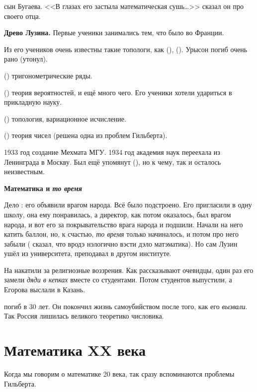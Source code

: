 \documentclass[a4paper,oneside,fleqn,10pt]{article}
\begin{document}
 сын Бугаева.
<<В глазах его застыла математическая сушь\ldots>> сказал он про своего отца.

\textbf{Древо Лузина.}
Первые ученики  занимались тем, что было во Франции.

Из его учеников
очень известны такие топологи, как  (),
 ().
Урысон погиб очень рано (утонул).

 () тригонометрические ряды.

 () теория вероятностей, и ещё много чего.
Его ученики хотели удариться в прикладную науку.

 () топология, вариационное исчисление.

 () теория чисел (решена одна из проблем Гильберта).

1933 год создание Мехмата МГУ. 1934 год академия наук переехала из Ленинграда в Москву.
Был ещё упомянут  (), но к чему, так и осталось неизвестным.

\textbf{Математика и \emph{то время}}

Дело : его объявили врагом народа. Всё было подстроено.
Его пригласили в одну школу, она ему понравилась, а директор, как потом оказалось,
был врагом народа, и вот его
за покрывательство врага народа и подшили.
Начали на него катить баллон, но, к счастью, \emph{то время} только начиналось,
и потом про него забыли ( сказал, что вродэ нэлогично вэсти дэло
матэматика). Но сам Лузин ушёл из университета, преподавал в другом институте.

На  накатили за религиозные воззрения. Как рассказывают очевидцы,
один раз его замели \emph{дяди в кепках} вместе со студентами. Потом студентов
выпустили, а Егорова выслали в Казань.

 погиб в 30 лет. Он покончил жизнь самоубийством после того, как его \emph{вызвали}.
Так Россия лишилась великого теоретико числовика.



\section{Математика XX века}

Когда мы говорим о математике 20 века, так сразу вспоминаются проблемы Гильберта.
\end{document}
